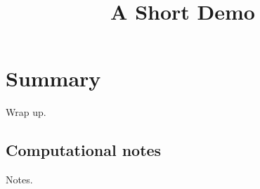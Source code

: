 \documentclass[article]{jss}
\title{A Short Demo}
\begin{document}
\section{Summary}
Wrap up.



\begin{appendix}
\section{Computational notes}
Notes.
\end{appendix}
\end{document}
